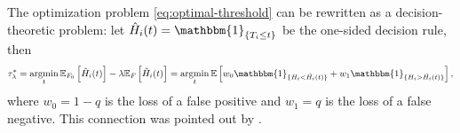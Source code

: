 \documentclass[a4paper,11pt]{article}
\theoremstyle{plain}
\theoremstyle{definition}
\def\EE{\mathbb{E}}
\def\1{\mathbbm{1}}
\newcommand{\argmin}{\mathop{\mathrm{argmin}}}
\theoremstyle{plain}
\newcommand{\No}{{n}}
\newcommand{\NoNc}{m}
\newcommand{\cdfTestStatistics}[1]{{F_{#1}}}
\newcommand{\cdfTestStatisticsNull}{{F_{0}}}
\newcommand{\hypothesis}[1]{{H_{#1}}}
\newcommand{\localFDR}{\text{local-FDR}}
\newcommand{\threshold}{{t}}
\newcommand{\trueThreshold}{{\tau^*_\lambda}}
\newcommand{\estimatedThreshold}{{\hat{\tau}_{\lambda, \No}}}
\newcommand{\BayesRiskLambda}{{R_{\lambda}}}
\newcommand{\EmpiricalCdfTestStatistics}{{{F}_n}}
\newcommand{\EmpiricalCdfTestStatisticsNull}{{{F}_{0,\NoNc}}}
\newcommand{\weightNull}{{w_0}}
\newcommand{\weightNonNull}{{w_1}}
\begin{document}

The optimization problem \eqref{eq:optimal-threshold} can be rewritten
as a decision-theoretic problem: let $\hat{H}_i(t) = \1_{\{T_i \leq
  \threshold\}}$ be the one-sided decision rule, then
\begin{equation}
  \label{eq:optimal-threshold-2}
  \tau_{\lambda}^{*} = \argmin_\threshold
  \EE_{\cdfTestStatisticsNull}\left[\hat{H}_i(t)\right]
   - \lambda \EE_{\cdfTestStatistics{}}\left[\hat{H}_i(t)\right]
   = \argmin_\threshold \mathbb{E}\left[
     \weightNull \1_{\{\hypothesis{i} < \hat{\hypothesis{i}}(t)\}}
     + \weightNonNull \1_{\{\hypothesis{i} > \hat{\hypothesis{i}}(t)\}}
  \right],
\end{equation}
where $\weightNull = 1-q$ is the loss of a false
positive and $\weightNonNull = q$ is the loss of a
false negative. 
This connection was pointed out by
\textcite{sun2007oracle}.
\end{document}

